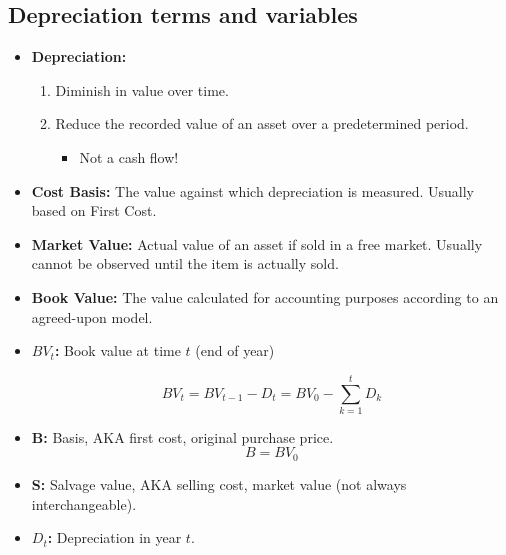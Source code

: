 \subsection{Depreciation terms and variables}
\begin{terminology}
    \begin{itemize}
        \item \textbf{Depreciation:}
            \begin{enumerate}
                \item Diminish in value over time.
                \item Reduce the recorded value of an asset over a predetermined period.
                    \begin{itemize}
                        \item Not a cash flow!
                    \end{itemize}
            \end{enumerate}
        
        \item \textbf{Cost Basis:} The value against which depreciation is measured. Usually based on First Cost.
        
        \item \textbf{Market Value:} Actual value of an asset if sold in a free market. Usually cannot be observed until the item is actually sold.
        
        \item \textbf{Book Value:} The value calculated for accounting purposes according to an agreed-upon model.
        
        \item \textbf{$BV_t$:} Book value at time $t$ (end of year)
        
        \begin{equation}
            BV_t = BV_{t-1} - D_t = BV_0 - \sum_{k=1}^{t} D_k
        \end{equation}
        
        \item \textbf{B:} Basis, AKA first cost, original purchase price.
            \[
            B = BV_0
            \]
        
        \item \textbf{S:} Salvage value, AKA selling cost, market value (not always interchangeable).
        
        \item \textbf{$D_t$:} Depreciation in year $t$.
        

\end{itemize}
\end{terminology}
